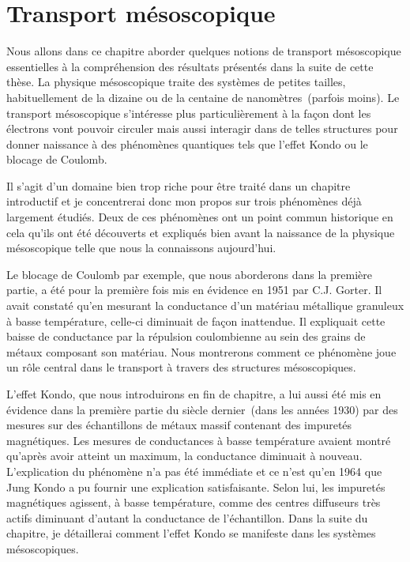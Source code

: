 


\chapter{Transport mésoscopique}

Nous allons dans ce chapitre aborder quelques notions de transport mésoscopique essentielles à la compréhension des résultats présentés dans la suite de cette thèse. La physique mésoscopique traite des systèmes de petites tailles, habituellement de la dizaine ou de la centaine de nanomètres~(parfois moins). Le transport mésoscopique s'intéresse plus particulièrement à la façon dont les électrons vont pouvoir circuler mais aussi interagir dans de telles structures pour donner naissance à des phénomènes quantiques tels que l'effet Kondo ou le blocage de Coulomb. 

Il s'agit d'un domaine bien trop riche pour être traité dans un chapitre introductif et je concentrerai donc mon propos sur trois phénomènes déjà largement étudiés. Deux de ces phénomènes ont un point commun historique en cela qu'ils ont été découverts et expliqués bien avant la naissance de la physique mésoscopique telle que nous la connaissons aujourd'hui.

Le blocage de Coulomb par exemple, que nous aborderons dans la première partie, a été pour la première fois mis en évidence en 1951 par C.J. Gorter. Il avait constaté qu'en mesurant la conductance d'un matériau métallique granuleux à basse température, celle-ci diminuait de façon inattendue. Il expliquait cette baisse de conductance par la répulsion coulombienne au sein des grains de métaux composant son matériau. Nous montrerons comment ce phénomène joue un rôle central dans le transport à travers des structures mésoscopiques.

L'effet Kondo, que nous introduirons en fin de chapitre, a lui aussi été mis en évidence dans la première partie du siècle dernier~(dans les années 1930) par des mesures sur des échantillons de métaux massif contenant des impuretés magnétiques. Les mesures de conductances à basse température avaient montré qu'après avoir atteint un maximum, la conductance diminuait à nouveau. L'explication du phénomène n'a pas été immédiate et ce n'est qu'en 1964 que Jung Kondo a pu fournir une explication satisfaisante. Selon lui, les impuretés magnétiques agissent, à basse température, comme des centres diffuseurs très actifs diminuant d'autant la conductance de l'échantillon. Dans la suite du chapitre, je détaillerai comment l'effet Kondo se manifeste dans les systèmes mésoscopiques.

